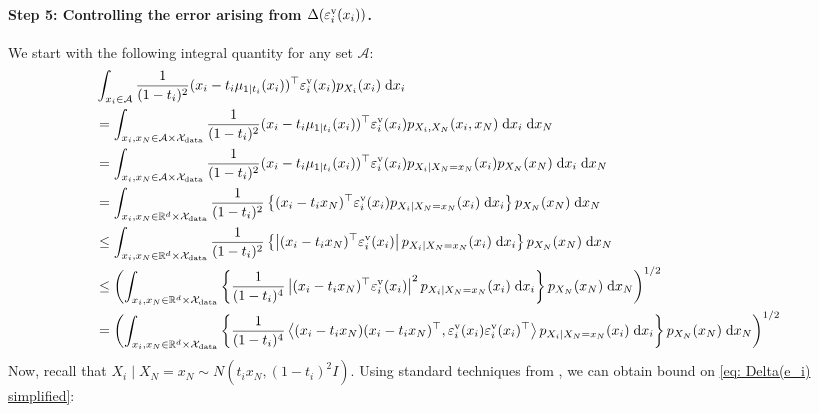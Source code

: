 \documentclass{article}
\theoremstyle{plain}
\theoremstyle{definition}
\theoremstyle{remark}
\def\bbR{\mathbb{R}}
\def\cA{\mathcal{A}}
\def\cX{\mathcal{X}}
\def\dx{{\mathrm{d}x}}
\newcommand{\rd}{\color{red}}
\begin{document}
\paragraph{Step 5: Controlling the error arising from $\Delta(\varepsilon_i^{\rm v}(x_i))$.}
We start with the following integral quantity for any set $\cA$:
\begin{equation}
\label{eq: Delta(e_i) simplified}
\begin{aligned}
    & \int_{x_i \in \cA} \frac{1}{(1-t_i)^2}(x_i - t_i \mu_{1 \mid t_i}(x_i))^\top \varepsilon^{\rm v}_i(x_i)p_{X_i}(x_i) \; \dx_i\\
    & = \int_{x_i, x_N \in \cA \times \cX_{\rm data}} \frac{1}{(1-t_i)^2}(x_i - t_i \mu_{1 \mid t_i}(x_i))^\top \varepsilon^{\rm v}_i(x_i)p_{X_i, X_N}(x_i, x_N) \; \dx_i\; \dx_N\\
    &  = \int_{x_i, x_N \in \cA \times \cX_{\rm data}} \frac{1}{(1-t_i)^2}(x_i - t_i \mu_{1 \mid t_i}(x_i))^\top \varepsilon^{\rm v}_i(x_i)
    p_{X_i \mid X_N = x_N}(x_i) p_{X_N}(x_N) \; \dx_i\; \dx_N
    \\
    & = \int_{x_i, x_N \in \bbR^d \times \cX_{\rm data}} \frac{1}{(1-t_i)^2}\left\{(x_i - t_i x_N)^\top \varepsilon^{\rm v}_i(x_i) p_{X_i \mid X_N = x_N}(x_i)\; \dx_i \right\} p_{X_N}(x_N) \; \dx_N\\
    & \le \int_{x_i, x_N \in \bbR^d \times \cX_{\rm data}} \frac{1}{(1-t_i)^2}\left\{\left\vert(x_i - t_i x_N)^\top \varepsilon^{\rm v}_i(x_i)\right\vert p_{X_i \mid X_N = x_N}(x_i)\; \dx_i  \right\} p_{X_N}(x_N) \; \dx_N \\
    & \le \left(\int_{x_i, x_N \in \bbR^d \times \cX_{\rm data}} \left\{\frac{1}{(1-t_i)^4}\left\vert(x_i - t_i x_N)^\top \varepsilon^{\rm v}_i(x_i)\right\vert ^2 p_{X_i \mid X_N = x_N}(x_i)\; \dx_i  \right\} p_{X_N}(x_N) \; \dx_N\right)^{1/2}\\
    &  = \left(\int_{x_i, x_N \in \bbR^d \times \cX_{\rm data}} \left\{\frac{1}{(1-t_i)^4}\left \langle (x_i - t_i x_N) (x_i - t_i x_N)^\top , \varepsilon^{\rm v}_i(x_i) \varepsilon^{\rm v}_i(x_i)^\top \right\rangle  p_{X_i \mid X_N = x_N}(x_i)\; \dx_i  \right\} p_{X_N}(x_N) \; \dx_N\right)^{1/2} 
\end{aligned}
\end{equation}
Now, recall that $X_i \mid X_N = x_N \sim N(t_i x_N , (1-t_i)^2 I)$. Using standard techniques from \citet[Section B.5]{liang2025low}, we can obtain bound on \eqref{eq: Delta(e_i) simplified}:
\end{document}
